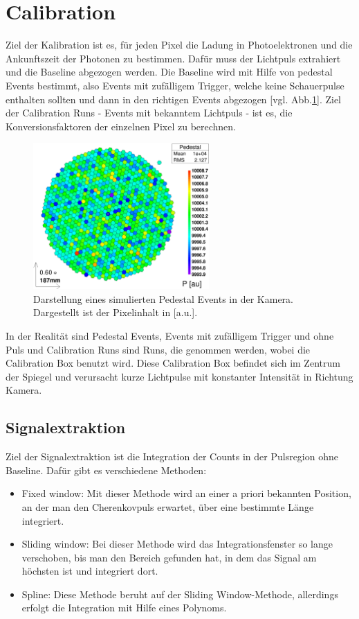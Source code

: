 \section{Calibration}
Ziel der Kalibration ist es, für jeden Pixel die Ladung in Photoelektronen und die Ankunftszeit der Photonen zu bestimmen.
Dafür muss der Lichtpuls extrahiert und die Baseline abgezogen werden.
Die Baseline wird mit Hilfe von pedestal Events bestimmt, also Events mit zufälligem Trigger, welche keine Schauerpulse enthalten sollten und dann in den richtigen Events abgezogen [vgl. Abb.\ref{Kamera-Bild-Pedestal}].
Ziel der Calibration Runs - Events mit bekanntem Lichtpuls - ist es, die Konversionsfaktoren der einzelnen Pixel zu berechnen.

\begin{figure}
    \centering
    \includegraphics[width=0.6\textwidth]{./Plots/Pedestal_fertig.png}
    \caption{Darstellung eines simulierten Pedestal Events in der Kamera. Dargestellt ist der Pixelinhalt in [a.u.].}
    \label{Kamera-Bild-Pedestal}
\end{figure}

In der Realität sind Pedestal Events, Events mit zufälligem Trigger und ohne Puls und Calibration Runs sind Runs, die genommen werden, wobei die Calibration Box benutzt wird.
Diese Calibration Box befindet sich im Zentrum der Spiegel und verursacht kurze Lichtpulse mit konstanter Intensität in Richtung Kamera.


\subsection{Signalextraktion}
Ziel der Signalextraktion ist die Integration der Counts in der Pulsregion ohne Baseline.
Dafür gibt es verschiedene Methoden:
\begin{itemize}
 \item Fixed window: Mit dieser Methode wird an einer a priori bekannten Position, an der man den Cherenkovpuls erwartet, über eine bestimmte Länge integriert.
 \item Sliding window: Bei dieser Methode wird das Integrationsfenster so lange verschoben, bis man den Bereich gefunden hat, in dem das Signal am höchsten ist und integriert dort.
 \item Spline: Diese Methode beruht auf der Sliding Window-Methode, allerdings erfolgt die Integration mit Hilfe eines Polynoms.
\end{itemize}

